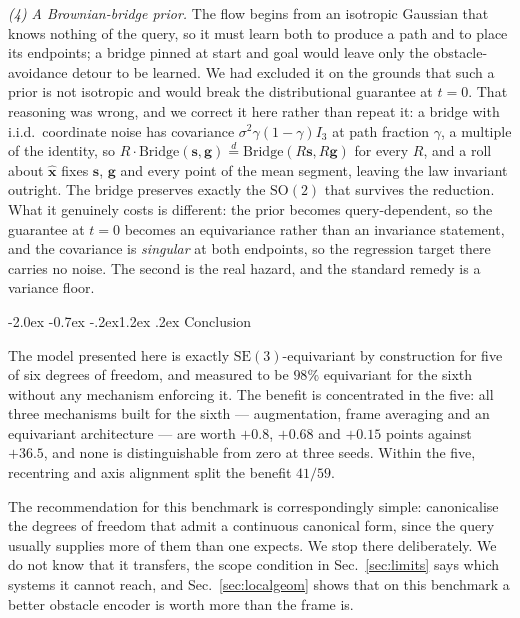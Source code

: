 \documentclass[10pt,twocolumn,letterpaper]{article}
\makeatletter
\renewcommand\section{\@startsection{section}{1}{\z@}%
  {-2.0ex \@plus -0.7ex \@minus -.2ex}{1.2ex \@plus.2ex}%
  {\centering\normalfont\large\bfseries}}
\theoremstyle{plain}
\newcommand{\xhat}{\hat{\mathbf{x}}}
\newcommand{\svec}{\mathbf{s}}
\newcommand{\gvec}{\mathbf{g}}
\newcommand{\SE}{\mathrm{SE}(3)}
\makeatother
\begin{document}
\emph{(4) A Brownian-bridge prior.} The flow begins from an isotropic Gaussian
that knows nothing of the query, so it must learn both to produce a path and to
place its endpoints; a bridge pinned at start and goal would leave only the
obstacle-avoidance detour to be learned. We had excluded it on the grounds that
such a prior is not isotropic and would break the distributional guarantee at
$t=0$. That reasoning was wrong, and we correct it here rather than repeat it: a
bridge with i.i.d.\ coordinate noise has covariance $\sigma^2\gamma(1-\gamma)I_3$
at path fraction $\gamma$, a multiple of the identity, so
$R\cdot\mathrm{Bridge}(\svec,\gvec)\overset{d}{=}\mathrm{Bridge}(R\svec,R\gvec)$
for every $R$, and a roll about $\xhat$ fixes $\svec$, $\gvec$ and every point of
the mean segment, leaving the law invariant outright. The bridge preserves
exactly the $\mathrm{SO}(2)$ that survives the reduction. What it genuinely costs
is different: the prior becomes query-dependent, so the guarantee at $t=0$ becomes
an equivariance rather than an invariance statement, and the covariance is
\emph{singular} at both endpoints, so the regression target there carries no
noise. The second is the real hazard, and the standard remedy is a variance
floor.

\section{Conclusion}

The model presented here is exactly $\SE$-equivariant by construction for five of
six degrees of freedom, and measured to be $98\%$ equivariant for the sixth
without any mechanism enforcing it. The benefit is concentrated in the five: all three
mechanisms built for the sixth --- augmentation, frame averaging and an
equivariant architecture --- are worth $+0.8$, $+0.68$ and $+0.15$ points against
$+36.5$, and none is distinguishable from zero at three seeds. Within the five,
recentring and axis alignment split the benefit $41/59$.

The recommendation for this benchmark is correspondingly simple: canonicalise the
degrees of freedom that admit a continuous canonical form, since the query
usually supplies more of them than one expects. We stop there deliberately. We do
not know that it transfers, the scope condition in Sec.~\ref{sec:limits} says
which systems it cannot reach, and Sec.~\ref{sec:localgeom} shows that on this
benchmark a better obstacle encoder is worth more than the frame is.
\end{document}
